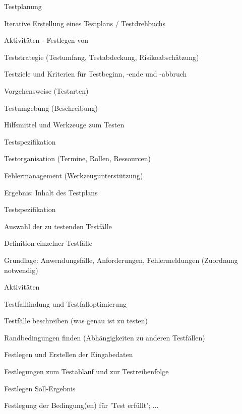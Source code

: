 \documentclass[a4paper]{article}
\begin{document}
\begin{multicols}{3}
  Testplanung
  \begin{itemize*}
    \item Iterative Erstellung eines Testplans / Testdrehbuchs
    \item Aktivitäten - Festlegen von
          \begin{itemize*}
            \item Teststrategie (Testumfang, Testabdeckung, Risikoabschätzung)
            \item Testziele und Kriterien für Testbeginn, -ende und -abbruch
            \item Vorgehensweise (Testarten)
            \item Testumgebung (Beschreibung)
            \item Hilfsmittel und Werkzeuge zum Testen
            \item Testspezifikation
            \item Testorganisation (Termine, Rollen, Ressourcen)
            \item Fehlermanagement (Werkzeugunterstützung)
          \end{itemize*}
    \item Ergebnis: Inhalt des Testplans
  \end{itemize*}

  Testspezifikation
  \begin{itemize*}
    \item Auswahl der zu testenden Testfälle
    \item Definition einzelner Testfälle
          \begin{itemize*}
            \item Grundlage: Anwendungsfälle, Anforderungen, Fehlermeldungen (Zuordnung notwendig)
          \end{itemize*}
    \item Aktivitäten
          \begin{itemize*}
            \item Testfallfindung und Testfalloptimierung
            \item Testfälle beschreiben (was genau ist zu testen)
            \item Randbedingungen finden (Abhängigkeiten zu anderen Testfällen)
            \item Festlegen und Erstellen der Eingabedaten
            \item Festlegungen zum Testablauf und zur Testreihenfolge
            \item Festlegen Soll-Ergebnis
            \item Festlegung der Bedingung(en) für 'Test erfüllt'; ...
          \end{itemize*}
  \end{itemize*}


\end{multicols}
\end{document}
